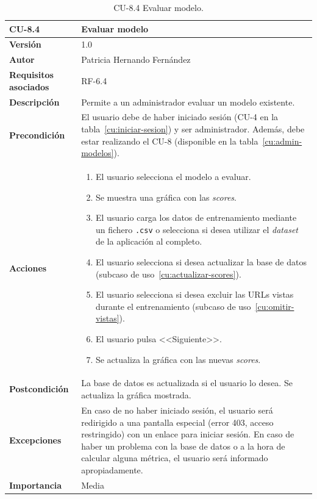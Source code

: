 \begin{table}[p]
	\centering
	\begin{tabularx}{\linewidth}{ p{} p{} }
		\toprule
		\textbf{CU-8.4}    & \textbf{Evaluar modelo}\\
		\toprule
		\textbf{Versión}              & 1.0    \\
		\textbf{Autor}                & Patricia Hernando Fernández \\
		\textbf{Requisitos asociados} & RF-6.4 \\
		\textbf{Descripción}          & Permite a un administrador evaluar un modelo existente.\\
		\textbf{Precondición}         & El usuario debe de haber iniciado sesión (CU-4 en la tabla~\ref{cu:iniciar-sesion}) y ser administrador. Además, debe estar realizando el CU-8 (disponible en la tabla~\ref{cu:admin-modelos}). \\
		\textbf{Acciones}             &
		\begin{enumerate}
			\def\labelenumi{\arabic{enumi}.}
			\tightlist
			\item El usuario selecciona el modelo a evaluar.
			\item Se muestra una gráfica con las \textit{scores}.
			\item El usuario carga los datos de entrenamiento mediante un fichero \texttt{.csv} o selecciona si desea utilizar el \textit{dataset} de la aplicación al completo.
			\item El usuario selecciona si desea actualizar la base de datos (subcaso de uso~\ref{cu:actualizar-scores}).
			\item El usuario selecciona si desea excluir las URLs vistas durante el entrenamiento (subcaso de uso~\ref{cu:omitir-vistas}).
			\item El usuario pulsa <<Siguiente>>.
			\item Se actualiza la gráfica con las nuevas \textit{scores}.
		\end{enumerate}\\
		\textbf{Postcondición}        & La base de datos es actualizada si el usuario lo desea. Se actualiza la gráfica mostrada. \\
		\textbf{Excepciones}          & En caso de no haber iniciado sesión, el usuario será redirigido a una pantalla especial (error 403, acceso restringido) con un enlace para iniciar sesión. En caso de haber un problema con la base de datos o a la hora de calcular alguna métrica, el usuario será informado apropiadamente.\\
		\textbf{Importancia}          & Media \\
		\bottomrule
	\end{tabularx}
	\caption{CU-8.4 Evaluar modelo.}
	\label{cu:evaluar-modelo}
\end{table}


